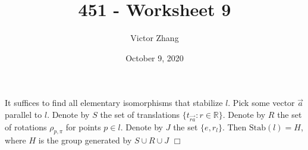 \documentclass{article}
\title{451 - Worksheet 9}
\author{Victor Zhang}
\date{October 9, 2020}
\begin{document}
\maketitle

\section{}
It suffices to find all elementary isomorphisms that stabilize $l$. Pick some vector $\vec{a}$ parallel to $l$. Denote by $S$ the set of translations $\{t_{\overrightarrow{ra}} : r \in \mathbb{R}\}$. Denote by $R$ the set of rotations $\rho_{p,\pi}$ for points $p \in l$. Denote by $J$ the set $\{e,r_l\}$. Then $\mathrm{Stab}(l) = H$, where $H$ is the group generated by $S \cup R \cup J$ $\Box$
\end{document}
